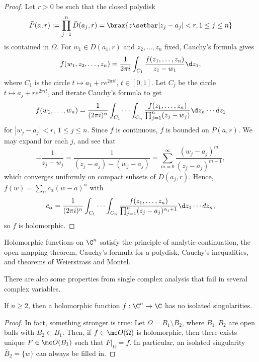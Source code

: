 \documentclass[11pt]{report}
\begin{document}
\begin{proof}
    Let $r>0$ be such that the closed polydisk 
    $$\bar P(a,r):=\prod_{j=1}^n\bar D(a_j,r) = \brax{z \setbar |z_j-a_j|<r, 1 \leq j \leq n}$$
    is contained in $\Omega$. For $w_1 \in D(a_1,r)$ and $z_2,\dots,z_n$ fixed, Cauchy's formula gives
    $$f(w_1,z_2,\dots,z_n) = \frac{1}{2\pi i}\int_{C_1}\frac{f(z_1,\dots,z_n)}{z_1-w_1}\d z_1,$$
    where $C_1$ is the circle $t \mapsto a_1 +re^{2\pi i t}$, $t \in [0,1]$. Let $C_j$ be the circle $t \mapsto a_j +re^{2\pi it}$, and iterate Cauchy's formula to get
    \begin{align*}
        f(w_1,\dots,w_n) = \frac{1}{(2\pi i )^n}\int_{C_1}\cdots \int_{C_n}\frac{f(z_1,\dots,z_n)}{\prod_{j=1}^n(z_j-w_j)}\d z_n \cdots dz_1
    \end{align*}
    for $|w_j-a_j|<r$, $1 \leq j \leq n$. Since $f$ is continuous, $f$ is bounded on $\bar P(a,r)$. We may expand for each $j$, and see that
    $$-\frac{1}{z_j-w_j}=\frac{1}{(z_j-a_j)-(w_j-a_j)}=\sum_{m=0}^\infty \frac{(w_j-a_j)^m}{(z_j-a_j)^{m+1}},$$
    which converges uniformly on compact subsets of $D(a_j,r)$. Hence, $f(w) = \sum_{\alpha}c_\alpha(w-a)^{\alpha}$ with
    $$c_\alpha = \frac{1}{(2\pi i)^n}\int_{C_1}\cdots \int_{C_n}\frac{f(z_1,\dots, z_n)}{\prod_{j=1}^n(z_j-a_j)^{\alpha_j+1}}\d z_1\cdots dz_n,$$
    so $f$ is holomorphic.
\end{proof}

\begin{prop}
    Holomorphic functions on $\C^n$ satisfy the principle of analytic continuation, the open mapping theorem, Cauchy's formula for a polydisk, Cauchy's inequalities, and theorems of Weierstrass and Montel.
\end{prop}

There are also some properties from single complex analysis that fail in several complex variables.

\begin{thm}
If $n\geq 2$, then a holomorphic function $f:\C^n\to \C$ has no isolated singularities.
\end{thm}

\begin{proof}
    In fact, something stronger is true: Let $\Omega = B_1 \setminus \bar B_2$, where $B_1,B_2$ are open balls with $\bar B_2 \subset B_1$. Then, if $f \in \mc O(\Omega)$ is holomorphic, then there exists unique $F \in \mc O(B_1)$ such that $F|_\Omega=f$. In particular, an isolated singularity $\bar B_2=\{w\}$ can always be filled in.
\end{proof}
\end{document}
